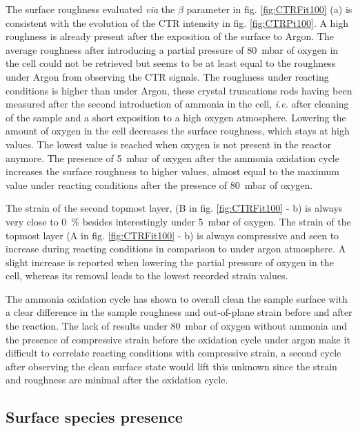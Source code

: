 The surface roughness evaluated \textit{via} the $\beta$ parameter in fig. \ref{fig:CTRFit100} (a) is consistent with the evolution of the CTR intensity in fig. \ref{fig:CTRPt100}.
A high roughness is already present after the exposition of the surface to Argon.
The average roughness after introducing a partial pressure of \qty{80}{\milli\bar} of oxygen in the cell could not be retrieved but seems to be at least equal to the roughness under Argon from observing the CTR signals.
The roughness under reacting conditions is higher than under Argon, these crystal truncations rods having been measured after the second introduction of ammonia in the cell, \textit{i.e.} after cleaning of the sample and a short exposition to a high oxygen atmosphere.
Lowering the amount of oxygen in the cell decreases the surface roughness, which stays at high values.
The lowest value is reached when oxygen is not present in the reactor anymore.
The presence of \qty{5}{\milli\bar} of oxygen after the ammonia oxidation cycle increases the surface roughness to higher values, almost equal to the maximum value under reacting conditions after the presence of \qty{80}{\milli\bar} of oxygen.

The strain of the second topmost layer, (B in fig. \ref{fig:CTRFit100} - b) is always very close to \qty{0}{\percent} besides interestingly under \qty{5}{\milli\bar} of oxygen.
The strain of the topmost layer (A in fig. \ref{fig:CTRFit100} - b) is always compressive and seen to increase during reacting conditions in comparison to under argon atmosphere.
A slight increase is reported when lowering the partial pressure of oxygen in the cell, whereas its removal leads to the lowest recorded strain values.

The ammonia oxidation cycle has shown to overall clean the sample surface with a clear difference in the sample roughness and out-of-plane strain before and after the reaction.
The lack of results under \qty{80}{\milli\bar} of oxygen without ammonia and the presence of compressive strain before the oxidation cycle under argon make it difficult to correlate reacting conditions with compressive strain, a second cycle after observing the clean surface state would lift this unknown since the strain and roughness are minimal after the oxidation cycle.

\subsection{Surface species presence}

